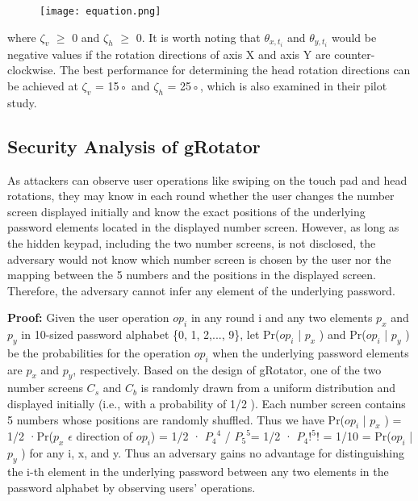 \documentclass[12pt,a4paper,oneside]{report}
\begin{document}
\begin{figure}[H]
    \begin{center}
        \label{abc}
            \texttt{[image: equation.png]}
            
    \end{center}
\end{figure}


where $\zeta_v$ $\geq$ 0 and $\zeta_h$ $\geq$ 0. It is worth noting that $\theta_{x,t_i}$
and $\theta_{y,t_i}$ would be negative values if the rotation directions
of axis X and axis Y are counter-clockwise. The best performance for determining the head rotation
directions can be achieved at $\zeta_v$ = 15◦ and $\zeta_h$ = 25◦, which
is also examined in their pilot study.

\subsection{Security Analysis of gRotator}

As attackers can observe
user operations like swiping on the touch pad and head
rotations, they may know in each round whether the user
changes the number screen displayed initially and know the
exact positions of the underlying password elements located in
the displayed number screen. However, as long as the hidden
keypad, including the two number screens, is not disclosed,
the adversary would not know which number screen is chosen
by the user nor the mapping between the 5 numbers and the
positions in the displayed screen. Therefore, the adversary
cannot infer any element of the underlying password.\newline 

\textbf{Proof:} Given the user operation $op_i$ in any round i and
any two elements $p_x$ and $p_y$ in 10-sized password alphabet
\{0, 1, 2,..., 9\}, let Pr($op_i$ | $p_x$ ) and Pr($op_i$ | $p_y$ ) be the probabilities for the operation $op_i$ when the underlying password
elements are $p_x$ and $p_y$, respectively. Based on the design
of gRotator, one of the two number screens $C_s$ and $C_b$ is
randomly drawn from a uniform distribution and displayed
initially (i.e., with a probability of 1/2 ). Each number screen
contains 5 numbers whose positions are randomly shuffled.\newline
Thus we have Pr($op_i$ | $p_x$ ) = 1/2 ·Pr($p_x$ $\epsilon$ direction of $op_i$) = 1/2 · ${P_4}^4$ / ${P_5}^5$= 1/2 · ${P_4!}^5!$ = 1/10 = Pr($op_i$ | $p_y$ ) for any i, x, and
y. Thus an adversary gains no advantage for distinguishing
the i-th element in the underlying password between any
two elements in the password alphabet by observing users’
operations. \newpage
\end{document}
